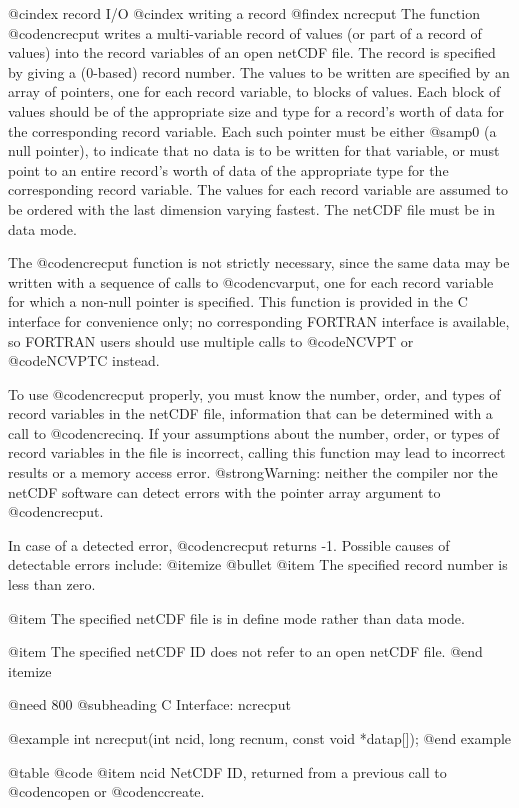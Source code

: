 @cindex record I/O
@cindex writing a record
@findex ncrecput
The function @code{ncrecput} writes a multi-variable record of values
(or part of a record of values) into the record variables of an open
netCDF file.  The record is specified by giving a (0-based) record number.  The
values to be written are specified by an array of pointers, one for each
record variable, to blocks of values.  Each block of values should be of
the appropriate size and type for a record's worth of data for the
corresponding record variable.  Each such pointer must be either @samp{0} (a
null pointer),
to indicate that no data is to be written for that variable, or must
point to an entire record's worth of data of the appropriate type for
the corresponding record variable.  The values for each record variable are assumed to be ordered with the
last dimension varying fastest.  The netCDF file must be in data mode.

The @code{ncrecput} function is not strictly necessary, since the same
data may be written with a sequence of calls to @code{ncvarput}, one for
each record variable for which a non-null pointer is specified.  This
function is provided in the C interface for convenience only; no
corresponding FORTRAN interface is available, so FORTRAN users should
use multiple calls to @code{NCVPT} or @code{NCVPTC} instead.

To use @code{ncrecput} properly, you must know the number, order, and
types of record variables in the netCDF file, information that can be
determined with a call to @code{ncrecinq}.  If your assumptions about
the number, order, or types of record variables in the file is
incorrect, calling this function may lead to incorrect results or a
memory access error.  @strong{Warning: neither the compiler nor the
netCDF software can detect errors with the pointer array argument to
@code{ncrecput}.}

In case of a detected error, @code{ncrecput} returns -1.  Possible
causes of detectable errors include:
@itemize @bullet
@item
The specified record number is less than zero.

@item
The specified netCDF file is in define mode rather than data mode.

@item
The specified netCDF ID does not refer to an open netCDF file.
@end itemize

@need 800
@subheading C Interface:  ncrecput

@example
int ncrecput(int ncid, long recnum, const void *datap[]);
@end example

@table @code
@item ncid
NetCDF ID, returned from a previous call to @code{ncopen} or
@code{nccreate}.

